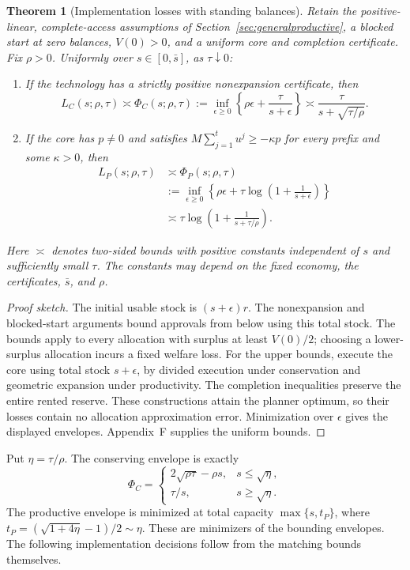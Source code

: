 \documentclass[ecta,draft]{econsocart}
\newtheorem{theorem}{Theorem}
\theoremstyle{definition}
\theoremstyle{definition}
\begin{document}
\begin{theorem}[Implementation losses with standing balances]
\label{thm:standingcapacity}
Retain the positive-linear, complete-access assumptions of
Section~\ref{sec:generalproductive}, a blocked start at zero balances,
$V(0)>0$, and a uniform core and completion certificate. Fix $\rho>0$.
Uniformly over $s\in[0,\bar s]$, as $\tau\downarrow0$:
\begin{enumerate}
 \item If the technology has a strictly positive nonexpansion
 certificate, then
 \[
 L_C(s;\rho,\tau)\asymp
 \Phi_C(s;\rho,\tau)
 :=\inf_{\epsilon\geq0}
 \left\{\rho\epsilon+\frac{\tau}{s+\epsilon}\right\}
 \asymp\frac{\tau}{s+\sqrt{\tau/\rho}}.
 \]
 \item If the core has $p\ne0$ and satisfies
 $M\sum_{j=1}^t u^j\geq-\kappa p$ for every prefix and some
 $\kappa>0$, then
 \[
 \begin{aligned}
 L_P(s;\rho,\tau)&\asymp\Phi_P(s;\rho,\tau)\\
 &:=\inf_{\epsilon\geq0}
 \left\{\rho\epsilon+
       \tau\log\left(1+\frac1{s+\epsilon}\right)\right\}\\
 &\asymp\tau\log\left(1+\frac1{s+\tau/\rho}\right).
 \end{aligned}
 \]
\end{enumerate}
Here $\asymp$ denotes two-sided bounds with positive constants independent
of $s$ and sufficiently small $\tau$. The constants may depend on the
fixed economy, the certificates, $\bar s$, and $\rho$.
\end{theorem}

\begin{proof}[Proof sketch]
The initial usable stock is $(s+\epsilon)r$. The nonexpansion and
blocked-start arguments bound approvals from below using this total
stock. The bounds apply to every allocation with surplus at least
$V(0)/2$; choosing a lower-surplus allocation incurs a fixed welfare
loss. For the upper bounds, execute the core using total stock
$s+\epsilon$, by divided execution under conservation and geometric
expansion under productivity. The completion inequalities preserve
the entire rented reserve. These constructions attain the planner
optimum, so their losses contain no allocation approximation error.
Minimization over $\epsilon$ gives the displayed envelopes.
Appendix~F%
 supplies the uniform bounds.
\end{proof}

Put $\eta=\tau/\rho$. The conserving envelope is exactly
\[
 \Phi_C=
 \begin{cases}
 2\sqrt{\rho\tau}-\rho s,&s\leq\sqrt\eta,\\
 \tau/s,&s\geq\sqrt\eta.
 \end{cases}
\]
The productive envelope is minimized at total capacity
$\max\{s,t_P\}$, where $t_P=(\sqrt{1+4\eta}-1)/2\sim\eta$.
These are minimizers of the bounding envelopes. The following
implementation decisions follow from the matching bounds themselves.
\end{document}
